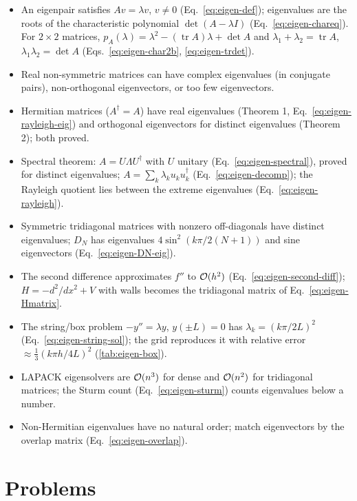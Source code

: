 \begin{itemize}
\item An eigenpair satisfies $Av=\lambda v$, $v\ne0$ (Eq.~\eqref{eq:eigen-def}); eigenvalues are the roots of the characteristic polynomial $\det(A-\lambda I)$ (Eq.~\eqref{eq:eigen-chareq}). For $2\times2$ matrices, $p_A(\lambda)=\lambda^2-(\operatorname{tr}A)\lambda+\det A$ and $\lambda_1+\lambda_2=\operatorname{tr}A$, $\lambda_1\lambda_2=\det A$ (Eqs.~\eqref{eq:eigen-char2b}, \eqref{eq:eigen-trdet}).
\item Real non-symmetric matrices can have complex eigenvalues (in conjugate pairs), non-orthogonal eigenvectors, or too few eigenvectors.
\item Hermitian matrices ($A^\dagger=A$) have real eigenvalues (Theorem 1, Eq.~\eqref{eq:eigen-rayleigh-eig}) and orthogonal eigenvectors for distinct eigenvalues (Theorem 2); both proved.
\item Spectral theorem: $A=U\Lambda U^\dagger$ with $U$ unitary (Eq.~\eqref{eq:eigen-spectral}), proved for distinct eigenvalues; $A=\sum_k\lambda_ku_ku_k^\dagger$ (Eq.~\eqref{eq:eigen-decomp}); the Rayleigh quotient lies between the extreme eigenvalues (Eq.~\eqref{eq:eigen-rayleigh}).
\item Symmetric tridiagonal matrices with nonzero off-diagonals have distinct eigenvalues; $D_N$ has eigenvalues $4\sin^2(k\pi/2(N+1))$ and sine eigenvectors (Eq.~\eqref{eq:eigen-DN-eig}).
\item The second difference approximates $f''$ to $\mathcal{O}(h^2)$ (Eq.~\eqref{eq:eigen-second-diff}); $H=-d^2/dx^2+V$ with walls becomes the tridiagonal matrix of Eq.~\eqref{eq:eigen-Hmatrix}.
\item The string/box problem $-y''=\lambda y$, $y(\pm L)=0$ has $\lambda_k=(k\pi/2L)^2$ (Eq.~\eqref{eq:eigen-string-sol}); the grid reproduces it with relative error $\approx\frac13(k\pi h/4L)^2$ (\cref{tab:eigen-box}).
\item LAPACK eigensolvers are $\mathcal{O}(n^3)$ for dense and $\mathcal{O}(n^2)$ for tridiagonal matrices; the Sturm count (Eq.~\eqref{eq:eigen-sturm}) counts eigenvalues below a number.
\item Non-Hermitian eigenvalues have no natural order; match eigenvectors by the overlap matrix (Eq.~\eqref{eq:eigen-overlap}).
\end{itemize}

\section{Problems}

